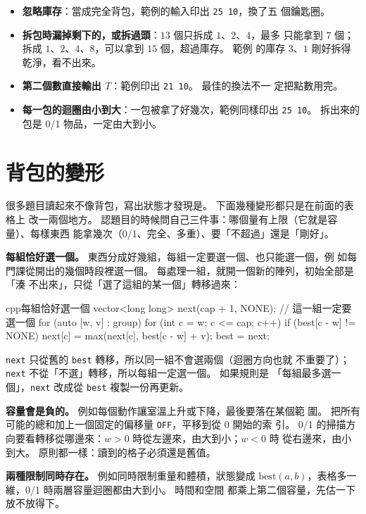 \begin{itemize}
\item \textbf{忽略庫存}：當成完全背包，範例的輸入印出 \texttt{25 10}，換了五
個鑰匙圈。
\item \textbf{拆包時漏掉剩下的，或拆過頭}：$13$ 個只拆成 $1$、$2$、$4$，最多
只能拿到 $7$ 個；拆成 $1$、$2$、$4$、$8$，可以拿到 $15$ 個，超過庫存。 範例
的庫存 $3$、$1$ 剛好拆得乾淨，看不出來。
\item \textbf{第二個數直接輸出 $T$}：範例印出 \texttt{21 10}。 最佳的換法不一
定把點數用完。
\item \textbf{每一包的迴圈由小到大}：一包被拿了好幾次，範例同樣印出
\texttt{25 10}。 拆出來的包是 0/1 物品，一定由大到小。
\end{itemize}

\section{背包的變形}
\label{sec:knap-variants}

很多題目讀起來不像背包，寫出狀態才發現是。 下面幾種變形都只是在前面的表格上
改一兩個地方。 認題目的時候問自己三件事：哪個量有上限（它就是容量）、每樣東西
能拿幾次（0/1、完全、多重）、要「不超過」還是「剛好」。

\textbf{每組恰好選一個。} 東西分成好幾組，每組一定要選一個、也只能選一個，例
如每門課從開出的幾個時段裡選一個。 每處理一組，就開一個新的陣列，初始全部是「湊
不出來」，只從「選了這組的某一個」轉移過來：

\begin{code}{cpp}{每組恰好選一個}
vector<long long> next(cap + 1, NONE);         // 這一組一定要選一個
for (auto [w, v] : group) {
    for (int c = w; c <= cap; c++) {
        if (best[c - w] != NONE) {
            next[c] = max(next[c], best[c - w] + v);
        }
    }
}
best = next;
\end{code}

\texttt{next} 只從舊的 \texttt{best} 轉移，所以同一組不會選兩個（迴圈方向也就
不重要了）；\texttt{next} 不從「不選」轉移，所以每組一定選一個。 如果規則是
「每組最多選一個」，\texttt{next} 改成從 \texttt{best} 複製一份再更新。

\textbf{容量會是負的。} 例如每個動作讓室溫上升或下降，最後要落在某個範
圍。 把所有可能的總和加上一個固定的偏移量 \texttt{OFF}，平移到從 $0$ 開始的索
引。 0/1 的掃描方向要看轉移從哪邊來：$w > 0$ 時從左邊來，由大到小；$w < 0$ 時
從右邊來，由小到大。 原則都一樣：讀到的格子必須還是舊值。

\textbf{兩種限制同時存在。} 例如同時限制重量和體積，狀態變成
$\mathrm{best}(a, b)$，表格多一維，0/1 時兩層容量迴圈都由大到小。 時間和空間
都乘上第二個容量，先估一下放不放得下。

